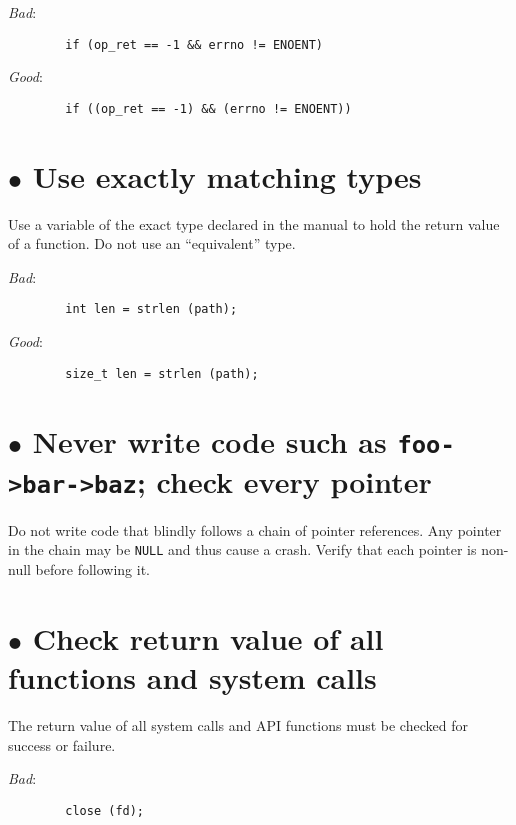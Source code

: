 \documentclass{article}[12pt]
\begin{document}
\textsl{Bad}:

\begin{verbatim}
        if (op_ret == -1 && errno != ENOENT)
\end{verbatim}

\textsl{Good}:

\begin{verbatim}
        if ((op_ret == -1) && (errno != ENOENT))
\end{verbatim}

\section*{$\bullet$ Use exactly matching types}
Use a variable of the exact type declared in the manual to hold the return value
of a function. Do not use an ``equivalent'' type.

\vspace{2ex}

\textsl{Bad}:

\begin{verbatim}
        int len = strlen (path);
\end{verbatim}

\textsl{Good}:

\begin{verbatim}
        size_t len = strlen (path);
\end{verbatim}

\section*{$\bullet$ Never write code such as \texttt{foo->bar->baz}; check every pointer}
Do not write code that blindly follows a chain of pointer references. Any pointer in
the chain may be \texttt{NULL} and thus cause a crash. Verify that each pointer
is non-null before following it.

\section*{$\bullet$ Check return value of all functions and system calls}
The return value of all system calls and API functions must be checked for success
or failure.

\vspace{2ex}
\textsl{Bad}:

\begin{verbatim}
        close (fd);
\end{verbatim}
\end{document}

